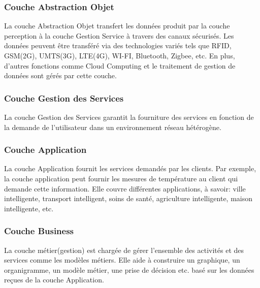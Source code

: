 \subsubsection{Couche Abstraction Objet}
La couche Abstraction Objet transfert les données produit par la couche perception à la couche Gestion Service à travers des canaux sécurisés. Les données peuvent être transféré via des technologies variés tels que RFID, GSM(2G), UMTS(3G), LTE(4G), WI-FI, Bluetooth, Zigbee, etc. En plus, d’autres fonctions comme Cloud Computing et le traitement de gestion de données sont gérés par cette couche.
\subsubsection{Couche Gestion des Services}
La couche Gestion des Services garantit la fourniture des services en fonction de la demande de l'utilisateur dans un environnement réseau hétérogène.
\subsubsection{Couche Application}
La couche Application fournit les services demandés par les clients. Par exemple, la couche application peut fournir les mesures de température au client qui demande cette information.
Elle couvre dif{\kern0pt}férentes applications, à savoir: ville intelligente, transport intelligent, soins de santé, agriculture intelligente, maison intelligente, etc.
\subsubsection{Couche Business}
La couche métier(gestion) est chargée de gérer l’ensemble des activités et des services comme les modèles métiers. Elle aide à construire un graphique, un organigramme, un modèle métier, une prise de décision etc. basé sur les données reçues de la couche Application.

